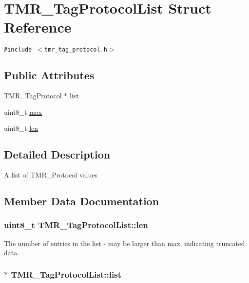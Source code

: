 \hypertarget{struct_t_m_r___tag_protocol_list}{
\section{TMR\_\-TagProtocolList Struct Reference}
\label{struct_t_m_r___tag_protocol_list}
}
{\tt \#include $<$tmr\_\-tag\_\-protocol.h$>$}

\subsection*{Public Attributes}
\begin{CompactItemize}
\item 
\hyperlink{tmr__tag__protocol_8h_1e727f69e94ccc81da4d3b9440aba934}{TMR\_\-TagProtocol} $\ast$ \hyperlink{struct_t_m_r___tag_protocol_list_c1ff5cf92d820a69e884c2bc8c7d1fed}{list}
\item 
uint8\_\-t \hyperlink{struct_t_m_r___tag_protocol_list_c0261e3e136c45da1d323439fb359f3d}{max}
\item 
uint8\_\-t \hyperlink{struct_t_m_r___tag_protocol_list_ca4b990c4b1d3bf5bb9227af8e00dc16}{len}
\end{CompactItemize}


\subsection{Detailed Description}
A list of TMR\_\-Protocol values 

\subsection{Member Data Documentation}
\hypertarget{struct_t_m_r___tag_protocol_list_ca4b990c4b1d3bf5bb9227af8e00dc16}{
\subsubsection[{len}]{\setlength{\rightskip}{0pt plus 5cm}uint8\_\-t {\bf TMR\_\-TagProtocolList::len}}}
\label{struct_t_m_r___tag_protocol_list_ca4b990c4b1d3bf5bb9227af8e00dc16}


The number of entries in the list - may be larger than max, indicating truncated data. \hypertarget{struct_t_m_r___tag_protocol_list_c1ff5cf92d820a69e884c2bc8c7d1fed}{
\subsubsection[{list}]{$\ast$ {\bf TMR\_\-TagProtocolList::list}}}
\label{struct_t_m_r___tag_protocol_list_c1ff5cf92d820a69e884c2bc8c7d1fed}


